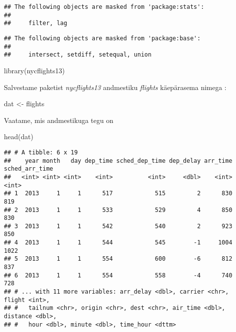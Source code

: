 \documentclass[
]{book}
\newenvironment{Shaded}{\begin{snugshade}}{\end{snugshade}}
\newcommand{\FunctionTok}[1]{\textcolor[rgb]{0.00,0.00,0.00}{#1}}
\newcommand{\NormalTok}[1]{#1}
\newcommand{\OtherTok}[1]{\textcolor[rgb]{0.56,0.35,0.01}{#1}}
\begin{document}
\begin{verbatim}
## The following objects are masked from 'package:stats':
## 
##     filter, lag
\end{verbatim}

\begin{verbatim}
## The following objects are masked from 'package:base':
## 
##     intersect, setdiff, setequal, union
\end{verbatim}

\begin{Shaded}
\begin{Highlighting}[]
\FunctionTok{library}\NormalTok{(nycflights13)}
\end{Highlighting}
\end{Shaded}

Salvestame paketist \emph{nycflights13} andmestiku \emph{flights} käepärasema nimega :

\begin{Shaded}
\begin{Highlighting}[]
\NormalTok{dat }\OtherTok{\textless{}{-}}\NormalTok{ flights}
\end{Highlighting}
\end{Shaded}

Vaatame, mis andmestikuga tegu on

\begin{Shaded}
\begin{Highlighting}[]
\FunctionTok{head}\NormalTok{(dat)}
\end{Highlighting}
\end{Shaded}

\begin{verbatim}
## # A tibble: 6 x 19
##    year month   day dep_time sched_dep_time dep_delay arr_time sched_arr_time
##   <int> <int> <int>    <int>          <int>     <dbl>    <int>          <int>
## 1  2013     1     1      517            515         2      830            819
## 2  2013     1     1      533            529         4      850            830
## 3  2013     1     1      542            540         2      923            850
## 4  2013     1     1      544            545        -1     1004           1022
## 5  2013     1     1      554            600        -6      812            837
## 6  2013     1     1      554            558        -4      740            728
## # ... with 11 more variables: arr_delay <dbl>, carrier <chr>, flight <int>,
## #   tailnum <chr>, origin <chr>, dest <chr>, air_time <dbl>, distance <dbl>,
## #   hour <dbl>, minute <dbl>, time_hour <dttm>
\end{verbatim}
\end{document}
